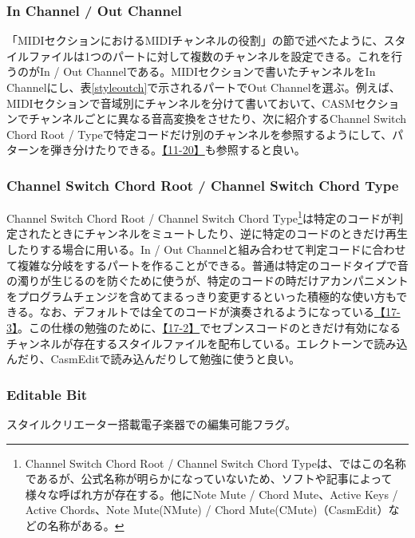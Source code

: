 \documentclass[uplatex, 10pt, dvipdfmx]{jsarticle}
\numberwithin{equation}{section}
\begin{document}
\subsubsection{In Channel / Out Channel}
「MIDIセクションにおけるMIDIチャンネルの役割」の節で述べたように、スタイルファイルは1つのパートに対して複数のチャンネルを設定できる。これを行うのがIn / Out Channelである。MIDIセクションで書いたチャンネルをIn Channelにし、表\ref{styleoutch}で示されるパートでOut Channelを選ぶ。例えば、MIDIセクションで音域別にチャンネルを分けて書いておいて、CASMセクションでチャンネルごとに異なる音高変換をさせたり、次に紹介するChannel Switch Chord Root / Typeで特定コードだけ別のチャンネルを参照するようにして、パターンを弾き分けたりできる。\href{http://els01stylefile.music.coocan.jp/Stagea_Style/Stagea_Style_P1120a.htm}{【11-20】}も参照すると良い。

\subsubsection{Channel Switch Chord Root / Channel Switch Chord Type}
Channel Switch Chord Root / Channel Switch Chord Type\footnote{Channel Switch Chord Root / Channel Switch Chord Typeは、\cite{スタイル}ではこの名称であるが、公式名称が明らかになっていないため、ソフトや記事によって様々な呼ばれ方が存在する。他にNote Mute / Chord Mute\cite{style}、Active Keys / Active Chords\cite{CASMeditor}、Note Mute(NMute) / Chord Mute(CMute)（CasmEdit）などの名称がある。}は特定のコードが判定されたときにチャンネルをミュートしたり、逆に特定のコードのときだけ再生したりする場合に用いる。In / Out Channelと組み合わせて判定コードに合わせて複雑な分岐をするパートを作ることができる。普通は特定のコードタイプで音の濁りが生じるのを防ぐために使うが、特定のコードの時だけアカンパニメントをプログラムチェンジを含めてまるっきり変更するといった積極的な使い方もできる。なお、デフォルトでは全てのコードが演奏されるようになっている\href{http://els01stylefile.music.coocan.jp/Stagea_Style/P1703.htm}{【17-3】}。この仕様の勉強のために、\href{http://els01stylefile.music.coocan.jp/Stagea_Style/P1702.htm}{【17-2】}でセブンスコードのときだけ有効になるチャンネルが存在するスタイルファイルを配布している。エレクトーンで読み込んだり、CasmEditで読み込んだりして勉強に使うと良い。

\subsubsection{Editable Bit}
スタイルクリエーター搭載電子楽器での編集可能フラグ。
\end{document}
